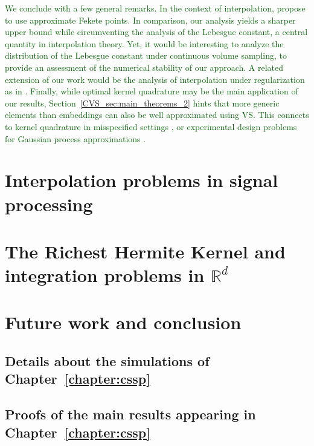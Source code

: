 \documentclass[twoside,11pt]{book}
\newcommand{\rev}[1]{\textcolor{darkgreen}{#1}}
\numberwithin{theorem}{chapter}
\numberwithin{definition}{chapter}
\numberwithin{proposition}{chapter}
\numberwithin{corollary}{chapter}
\numberwithin{example}{chapter}
\numberwithin{lemma}{chapter}
\begin{document}
\rev{We conclude with a few general remarks.}
\rev{
In the context of interpolation, \citep{KaSaTa19} propose to use approximate Fekete points. In comparison, our analysis yields a sharper upper bound while circumventing the analysis of the Lebesgue constant, a central quantity in interpolation theory. Yet, it would be interesting to analyze the distribution of the Lebesgue constant under continuous volume sampling, to provide an assessment of the numerical stability of our approach. A related extension of our work would be the analysis of interpolation under regularization as in \citep{Bac17}.
Finally, while optimal kernel quadrature may be the main application of our results, Section~\ref{CVS_sec:main_theorems_2} hints that more generic elements than embeddings can also be well approximated using VS. This connects to kernel quadrature in misspecified settings \citep{KaSrFu16}, or experimental design problems for Gaussian process approximations \citep{WyBrGi20}.
}


\clearpage

\chapter{Interpolation problems in signal processing}\label{chapter:signal_reconstruction}

\chapter{The Richest Hermite Kernel and integration problems in $\mathbb{R}^{d}$}

\chapter{Future work and conclusion}



\appendix

\section{Details about the simulations of Chapter~\ref{chapter:cssp} }
\section{Proofs of the main results appearing in Chapter~\ref{chapter:cssp} }

\end{document}
